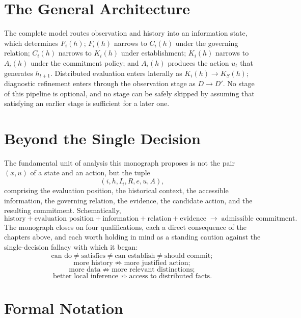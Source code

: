 \documentclass[11pt]{report}
\theoremstyle{definition}
\theoremstyle{plain}
\begin{document}
\chapter{The General Architecture}

The complete model routes observation and history into an information state, which determines $F_i(h)$; $F_i(h)$ narrows to $C_i(h)$ under the governing relation; $C_i(h)$ narrows to $K_i(h)$ under establishment; $K_i(h)$ narrows to $A_i(h)$ under the commitment policy; and $A_i(h)$ produces the action $u_t$ that generates $h_{t+1}$. Distributed evaluation enters laterally as $K_i(h) \to K_S(h)$; diagnostic refinement enters through the observation stage as $D \to D'$. No stage of this pipeline is optional, and no stage can be safely skipped by assuming that satisfying an earlier stage is sufficient for a later one.

\chapter{Beyond the Single Decision}

The fundamental unit of analysis this monograph proposes is not the pair $(x,u)$ of a state and an action, but the tuple
\[
(i, h, I_i, R, e, u, A),
\]
comprising the evaluation position, the historical context, the accessible information, the governing relation, the evidence, the candidate action, and the resulting commitment. Schematically,
\[
\text{history} + \text{evaluation position} + \text{information} + \text{relation} + \text{evidence} \;\to\; \text{admissible commitment}.
\]
The monograph closes on four qualifications, each a direct consequence of the chapters above, and each worth holding in mind as a standing caution against the single-decision fallacy with which it began:
\[
\text{can do} \neq \text{satisfies} \neq \text{can establish} \neq \text{should commit};
\]
\[
\text{more history} \not\Rightarrow \text{more justified action};
\]
\[
\text{more data} \not\Rightarrow \text{more relevant distinctions};
\]
\[
\text{better local inference} \not\Rightarrow \text{access to distributed facts}.
\]

\appendix

\chapter{Formal Notation}
\end{document}

